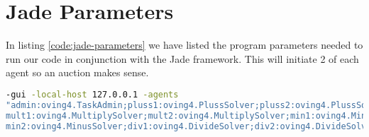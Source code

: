 \appendix
\section{Jade Parameters}\label{appendix:jade-parameters}
In listing \ref{code:jade-parameters} we have listed the program parameters
needed to run our code in conjunction with the Jade framework. This will
initiate 2 of each agent so an auction makes sense.
\begin{lstlisting}[language=bash, frame=single, caption=Parameters to run our agents on
Linux utilizing Jade, label=code:jade-parameters, breaklines=true]
-gui -local-host 127.0.0.1 -agents
"admin:oving4.TaskAdmin;pluss1:oving4.PlussSolver;pluss2:oving4.PlussSolver;
mult1:oving4.MultiplySolver;mult2:oving4.MultiplySolver;min1:oving4.MinusSolver;
min2:oving4.MinusSolver;div1:oving4.DivideSolver;div2:oving4.DivideSolver"
\end{lstlisting}
